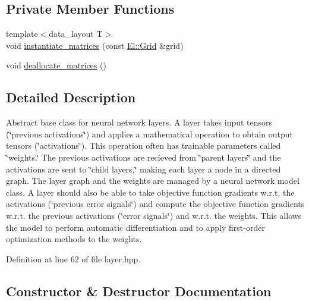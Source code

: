 \subsection*{Private Member Functions}
\begin{DoxyCompactItemize}
\item 
{\footnotesize template$<$data\+\_\+layout T$>$ }\\void \hyperlink{classlbann_1_1Layer_a2d50e9af2a9aa7e6741deb555641c30c}{instantiate\+\_\+matrices} (const \hyperlink{base_8hpp_a9951bb1719d534e0401b1f06cad19eab}{El\+::\+Grid} \&grid)
\item 
void \hyperlink{classlbann_1_1Layer_a888392d6ac6906093a8125c6a37de075}{deallocate\+\_\+matrices} ()
\end{DoxyCompactItemize}


\subsection{Detailed Description}
Abstract base class for neural network layers. A layer takes input tensors (\char`\"{}previous activations\char`\"{}) and applies a mathematical operation to obtain output tensors (\char`\"{}activations\char`\"{}). This operation often has trainable parameters called \char`\"{}weights.\char`\"{} The previous activations are recieved from \char`\"{}parent layers\char`\"{} and the activations are sent to \char`\"{}child layers,\char`\"{} making each layer a node in a directed graph. The layer graph and the weights are managed by a neural network model class. A layer should also be able to take objective function gradients w.\+r.\+t. the activations (\char`\"{}previous error signals\char`\"{}) and compute the objective function gradients w.\+r.\+t. the previous activations (\char`\"{}error signals\char`\"{}) and w.\+r.\+t. the weights. This allows the model to perform automatic differentiation and to apply first-\/order optimization methods to the weights. 

Definition at line 62 of file layer.\+hpp.



\subsection{Constructor \& Destructor Documentation}
\mbox{\label{classlbann_1_1Layer_a24e9c82354a0a2af1b70cbca2211e7d4}} 
